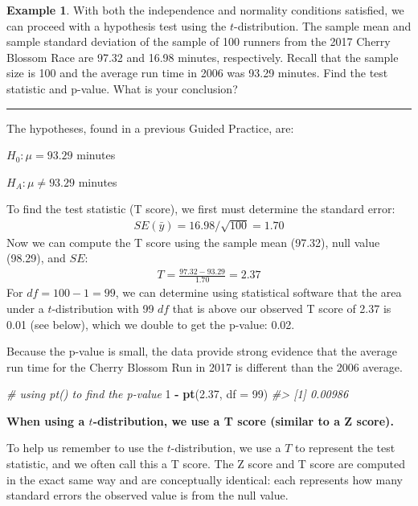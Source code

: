\documentclass[
  10pt,
  openany]{book}
\newenvironment{Shaded}{\begin{snugshade}}{\end{snugshade}}
\newcommand{\AttributeTok}[1]{\textcolor[rgb]{0.13,0.29,0.53}{#1}}
\newcommand{\CommentTok}[1]{\textcolor[rgb]{0.56,0.35,0.01}{\textit{#1}}}
\newcommand{\DecValTok}[1]{\textcolor[rgb]{0.00,0.00,0.81}{#1}}
\newcommand{\FloatTok}[1]{\textcolor[rgb]{0.00,0.00,0.81}{#1}}
\newcommand{\FunctionTok}[1]{\textcolor[rgb]{0.13,0.29,0.53}{\textbf{#1}}}
\newcommand{\NormalTok}[1]{#1}
\newcommand{\SpecialCharTok}[1]{\textcolor[rgb]{0.81,0.36,0.00}{\textbf{#1}}}
\theoremstyle{definition}
\theoremstyle{definition}
\newtheorem{example}{Example}[chapter]
\theoremstyle{definition}
\theoremstyle{definition}
\theoremstyle{remark}
\begin{document}
\begin{example}
With both the independence
and normality conditions satisfied,
we can proceed with a hypothesis test using
the \(t\)-distribution.
The sample mean and sample standard deviation
of the sample
of 100 runners from the
2017 Cherry Blossom Race
are 97.32 and 16.98 minutes,
respectively.
Recall that the sample size is 100
and the average run time in 2006 was 93.29 minutes.
Find the test statistic and p-value.
What is your conclusion?

\begin{center}\rule{0.5\linewidth}{0.5pt}\end{center}

The hypotheses, found in a previous Guided Practice, are:

\(H_0: \mu = 93.29\) minutes

\(H_A: \mu \neq 93.29\) minutes

To find the test statistic (T score),
we first must determine the standard error:
\begin{align*}
  SE(\bar{y})
    = 16.98 / \sqrt{100}
    = 1.70
  \end{align*}
Now we can compute the T score
using the sample mean (97.32),
null value (98.29), and \(SE\):
\begin{align*}
  T
    = \frac{97.32 - 93.29}{1.70}
    = 2.37
  \end{align*}
For \(df = 100 - 1 = 99\),
we can determine using statistical software
that the area under a \(t\)-distribution with 99 \(df\) that is above
our observed T score of 2.37 is 0.01 (see below),
which we double to get the p-value: 0.02.

Because the p-value is small,
the data provide strong evidence that the average
run time for the Cherry Blossom Run in 2017 is different
than the 2006 average.
\end{example}

\begin{Shaded}
\begin{Highlighting}[]
\CommentTok{\# using pt() to find the p{-}value}
\DecValTok{1} \SpecialCharTok{{-}} \FunctionTok{pt}\NormalTok{(}\FloatTok{2.37}\NormalTok{, }\AttributeTok{df =} \DecValTok{99}\NormalTok{)}
\CommentTok{\#\textgreater{} [1] 0.00986}
\end{Highlighting}
\end{Shaded}

\textbf{When using a \(t\)-distribution, we use a T score (similar to a Z score).}

To help us remember to use the \(t\)-distribution,
we use a \(T\) to represent the test statistic,
and we often call this a T score.
The Z score and T score are computed in the exact same way
and are conceptually identical:
each represents how many standard errors the observed value
is from the null value.
\end{document}
